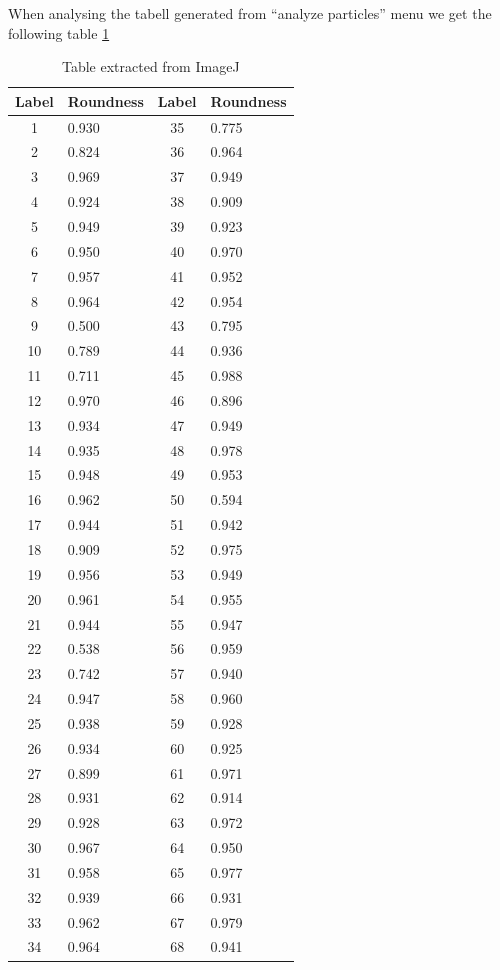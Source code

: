 \documentclass{article}
\begin{document}
When analysing the tabell generated from “analyze particles” menu we get the following table \ref{tab:imgj}
\begin{table}[H]
\centering
\begin{tabular}{|c|l|c|l|}
\hline
Label & Roundness&Label&Roundness\\\hline
1&0.930&35&0.775\\\hline
2&0.824&36&0.964\\\hline
3&0.969&37&0.949\\\hline
4&0.924&38&0.909\\\hline
5&0.949&39&0.923\\\hline
6&0.950&40&0.970\\\hline
7&0.957&41&0.952\\\hline
8&0.964&42&0.954\\\hline
9&0.500&43&0.795\\\hline
10&0.789&44&0.936\\\hline
11&0.711&45&0.988\\\hline
12&0.970&46&0.896\\\hline
13&0.934&47&0.949\\\hline
14&0.935&48&0.978\\\hline
15&0.948&49&0.953\\\hline
16&0.962&50&0.594\\\hline
17&0.944&51&0.942\\\hline
18&0.909&52&0.975\\\hline
19&0.956&53&0.949\\\hline
20&0.961&54&0.955\\\hline
21&0.944&55&0.947\\\hline
22&0.538&56&0.959\\\hline
23&0.742&57&0.940\\\hline
24&0.947&58&0.960\\\hline
25&0.938&59&0.928\\\hline
26&0.934&60&0.925\\\hline
27&0.899&61&0.971\\\hline
28&0.931&62&0.914\\\hline
29&0.928&63&0.972\\\hline
30&0.967&64&0.950\\\hline
31&0.958&65&0.977\\\hline
32&0.939&66&0.931\\\hline
33&0.962&67&0.979\\\hline
34&0.964&68&0.941\\\hline
\end{tabular}
\caption{Table extracted from ImageJ}
\label{tab:imgj}
\end{table}
\end{document}
